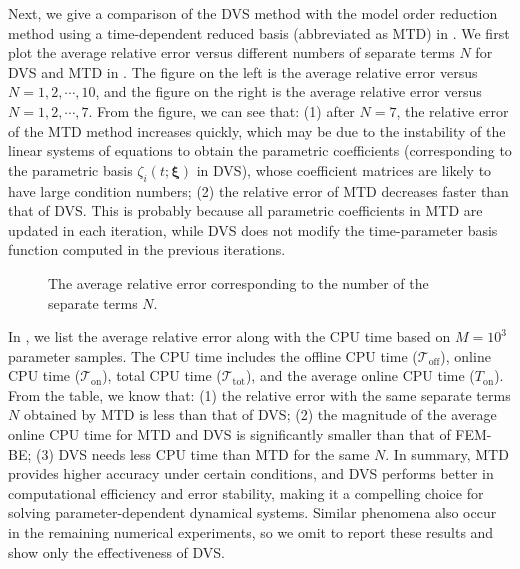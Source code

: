 \documentclass[10pt,a4paper]{article}
\numberwithin{equation}{section}
\numberwithin{lemma}{section}
\numberwithin{example}{section}
\numberwithin{definition}{section}
\numberwithin{assumption}{section}
\numberwithin{theorem}{section}
\numberwithin{proposition}{section}
\numberwithin{corollary}{section}
\numberwithin{remark}{section}
\begin{document}
 


Next, we give a comparison of the DVS method with the model order reduction method using a time-dependent reduced basis (abbreviated as MTD) in \cite{Friess2017DynamicalMR}. 
We first plot the average relative error versus different numbers of separate terms $N$ for DVS and MTD in .
The figure on the left is the average relative error versus $N=1,2, \cdots, 10$, and the figure on the right is the average relative error versus $N=1,2, \cdots, 7$.
From the figure, we can see that:
(1) after $N=7$, the relative error of the MTD method increases quickly,
which may be due to the instability of the linear systems of equations to obtain the parametric coefficients (corresponding to the parametric basis $\zeta_i(t;\bm{\xi})$ in DVS), whose coefficient matrices are likely to have large condition numbers;
(2) the relative error of MTD decreases faster than that of DVS. 
This is probably because all parametric coefficients in MTD are updated in each iteration, while DVS does not modify the time-parameter basis function computed in the previous iterations.  
\begin{figure}[htbp]
    \centering
    \caption{The average relative error corresponding to the number of the separate terms $N$.}
    \label{fig_MTD}
\end{figure}
In , we list the average relative error along with the CPU time based on $M=10^3$ parameter samples. The CPU time includes the offline CPU time ($\mathcal{T}_{\text{off}}$), online CPU time ($\mathcal{T}_{\text{on}}$), total CPU time ($\mathcal{T}_{\text{tot}}$), and the average online CPU time ($T_{\text{on}}$). 
From the table, we know that:
(1) the relative error with the same separate terms $N$ obtained by MTD is less than that of DVS;
(2) the magnitude of the average online CPU time for MTD and DVS is significantly smaller than that of FEM-BE;
(3) DVS needs less CPU time than MTD for the same $N$.
In summary, MTD provides higher accuracy under certain conditions, and DVS performs better in computational efficiency and error stability, making it a compelling choice for solving parameter-dependent dynamical systems.
Similar phenomena also occur in the remaining numerical experiments, so we omit to report these results and show only the effectiveness of DVS. 
 
\end{document}
